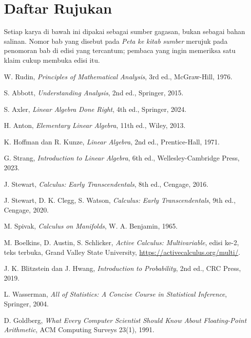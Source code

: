\chapter*{Daftar Rujukan}

Setiap karya di bawah ini dipakai sebagai sumber gagasan, bukan sebagai bahan salinan.
Nomor bab yang disebut pada \emph{Peta ke kitab sumber} merujuk pada penomoran bab di
edisi yang tercantum; pembaca yang ingin memeriksa satu klaim cukup membuka edisi itu.

\begin{sloppypar}
\begin{enumerate}[label={[\arabic*]},leftmargin=1.8em]
  \item W. Rudin, \emph{Principles of Mathematical Analysis}, 3rd ed.,
        McGraw-Hill, 1976.
  \item S. Abbott, \emph{Understanding Analysis}, 2nd ed., Springer, 2015.
  \item S. Axler, \emph{Linear Algebra Done Right}, 4th ed., Springer, 2024.
  \item H. Anton, \emph{Elementary Linear Algebra}, 11th ed., Wiley, 2013.
  \item K. Hoffman dan R. Kunze, \emph{Linear Algebra}, 2nd ed.,
        Prentice-Hall, 1971.
  \item G. Strang, \emph{Introduction to Linear Algebra}, 6th ed.,
        Wellesley-Cambridge Press, 2023.
  \item J. Stewart, \emph{Calculus: Early Transcendentals}, 8th ed.,
        Cengage, 2016.
  \item J. Stewart, D. K. Clegg, S. Watson, \emph{Calculus: Early
        Transcendentals}, 9th ed., Cengage, 2020.
  \item M. Spivak, \emph{Calculus on Manifolds}, W. A. Benjamin, 1965.
  \item M. Boelkins, D. Austin, S. Schlicker, \emph{Active Calculus:
        Multivariable}, edisi ke-2, teks terbuka, Grand Valley State University,
        \url{https://activecalculus.org/multi/}.
  \item J. K. Blitzstein dan J. Hwang, \emph{Introduction to Probability},
        2nd ed., CRC Press, 2019.
  \item L. Wasserman, \emph{All of Statistics: A Concise Course in Statistical
        Inference}, Springer, 2004.
  \item D. Goldberg, \emph{What Every Computer Scientist Should Know About
        Floating-Point Arithmetic}, ACM Computing Surveys 23(1), 1991.

\end{enumerate}
\end{sloppypar}
